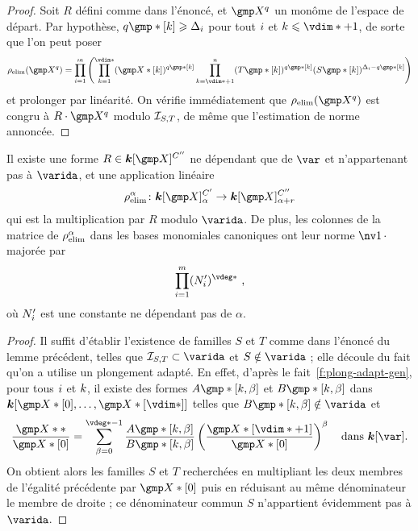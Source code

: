 \begin{proof}
  Soit \( R \) défini comme dans l'énoncé, et \( \vmp^q \) un monôme de
  l'espace de départ. Par hypothèse, \( q\mexp*[\ind] \ge \Delta_\fct \) pour
  tout \( i \) et \( \ind \le \vdim* + 1 \), de sorte que l'on peut poser
  \begin{equation}
    \relim( \vmp^q )
    =
    \prod\fctrange \left(
    \prod_{\ind=1}^{\vdim*}
    (\vmp*[\ind])^{q\mexp*[\ind]}
    \prod_{\ind=\vdim*+1}^\dimp
    (T\mexp*[\ind])^{q\mexp*[\ind]}
    (S\mexp*[\ind])^{\Delta_\fct - q\mexp*[\ind]}
    \right)
  \end{equation}
  et prolonger par linéarité. On vérifie immédiatement que \( \relim(\vmp^q)
  \) est congru à \( R \cdot \vmp^q \) modulo \( \mathcal I_{S, T} \), de même
  que l'estimation de norme annoncée.
\end{proof}

\begin{coro} \label{c:hmat-relim}
  Il existe une forme \( R \in \cdn [\vmp]^{C''} \) ne dépendant que de \(
    \var \) et n'appartenant pas à \( \varida \), et
  une application linéaire
  \begin{equation}
    \relim^\alpha \colon
    \cdn [\vmp]_ {\alpha}^{C'}
    \to
    \cdn [\vmp]_ {\alpha+r}^{C''}
  \end{equation}
  qui est la multiplication par \( R \) modulo \( \varida \).  De plus, les
  colonnes de la matrice de \( \rho\sb{\mathrm{elim}}^\alpha \) dans les bases monomiales
  canoniques ont leur norme \( \nv1\truc \) majorée par
  \begin{equation}
    \prod\fctrange
    (N'_\fct)^{\vdeg*}
    \pmm,
  \end{equation}
  où \( N'_i \) est une constante ne dépendant pas de \( \alpha \).
\end{coro}

\begin{proof}
  Il suffit d'établir l'existence de familles \( S \) et \( T \) comme dans
  l'énoncé du lemme précédent, telles que \( \Ideal_{S, T} \subset \varida \)
  et \( S \notin \varida \) ;
  elle découle du fait qu'on a utilise un plongement adapté.
  En effet, d'après le fait~\ref{f:plong-adapt-gen}, pour tous \( i \) et
  \( k \), il existe des formes \( A\mexp*[\ind, \beta] \) et \(
    B\mexp*[\ind, \beta] \) dans
  \( \cdn [ \vmp*[0], \dots, \vmp*[\vdim*] ] \) telles que \(
    B\mexp*[\ind, \beta] \notin \varida \) et
  \begin{equation}
    \frac{ \vmp** }{ \vmp*[0] }
    =
    \sum_{\beta = 0}^{\vdeg* - 1}
    \frac {A\mexp*[\ind, \beta]} {B\mexp*[\ind, \beta]}
    \left( \frac{ \vmp*[\vdim* + 1] }{ \vmp*[0] } \right) ^\beta
    \quad\text{dans \( \cdn[\var] \).}
  \end{equation}
  On obtient alors les familles \( S \) et \( T \) recherchées en multipliant
  les deux membres de l'égalité précédente par \( \vmp*[0] \) puis en
  réduisant au même dénominateur le membre de droite ; ce dénominateur commun
  \( S \) n'appartient évidemment pas à \( \varida \).
\end{proof}

